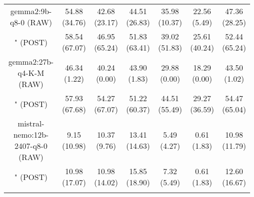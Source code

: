 \begin{table}[]
{\begin{tabular}{ccccccc}
      \multicolumn{1}{c|}{gemma2:9b-q8-0 (RAW)} & 54.88 (34.76) & 42.68 (23.17) & \multicolumn{1}{c|}{44.51 (26.83)} & 35.98 (10.37) & \multicolumn{1}{c|}{22.56 (5.49)} & 47.36 (28.25) \\

      \multicolumn{1}{c|}{" (POST)} & 58.54 (67.07) & 46.95 (65.24) & \multicolumn{1}{c|}{51.83 (63.41)} & 39.02 (51.83) & \multicolumn{1}{c|}{25.61 (40.24)} & 52.44 (65.24) \\
      \cline{1-7}

      \multicolumn{1}{c|}{gemma2:27b-q4-K-M (RAW)} & 46.34 (1.22) & 40.24 (0.00) & \multicolumn{1}{c|}{43.90 (1.83)} & 29.88 (0.00) & \multicolumn{1}{c|}{18.29 (0.00)} & 43.50 (1.02) \\

      \multicolumn{1}{c|}{" (POST)} & 57.93 (67.68) & 54.27 (67.07) & \multicolumn{1}{c|}{51.22 (60.37)} & 44.51 (55.49) & \multicolumn{1}{c|}{29.27 (36.59)} & 54.47 (65.04) \\
      \cline{1-7}

      \multicolumn{1}{c|}{mistral-nemo:12b-2407-q8-0 (RAW)} & 9.15 (10.98) & 10.37 (9.76) & \multicolumn{1}{c|}{13.41 (14.63)} & 5.49 (4.27) & \multicolumn{1}{c|}{0.61 (1.83)} & 10.98 (11.79) \\

      \multicolumn{1}{c|}{" (POST)} & 10.98 (17.07) & 10.98 (14.02) & \multicolumn{1}{c|}{15.85 (18.90)} & 7.32 (5.49) & \multicolumn{1}{c|}{0.61 (1.83)} & 12.60 (16.67) \\
      \cline{1-7}

      \\ \hline
    \end{tabular}%
  }
\end{table}